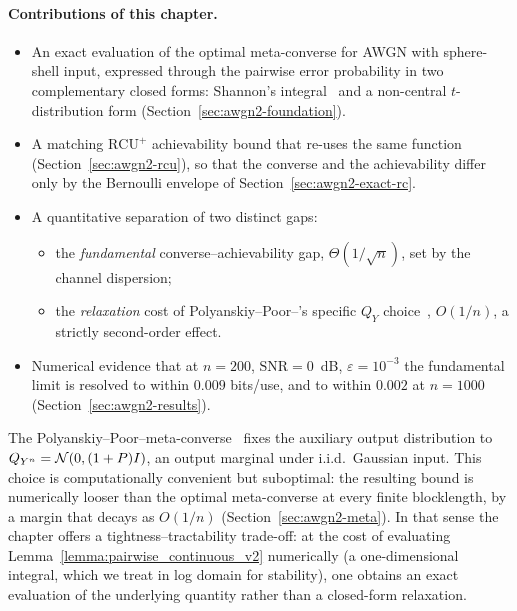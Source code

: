 \paragraph{Contributions of this chapter.}
\begin{itemize}
	\item An exact evaluation of the optimal meta-converse for AWGN with sphere-shell input, expressed through the pairwise error probability in two complementary closed forms: Shannon's integral~\cite{shannon1959probability} and a non-central $t$-distribution form (Section~\ref{sec:awgn2-foundation}).
	\item A matching $\mathrm{RCU}^+$ achievability bound that re-uses the same function (Section~\ref{sec:awgn2-rcu}), so that the converse and the achievability differ only by the Bernoulli envelope of Section~\ref{sec:awgn2-exact-rc}.
	\item A quantitative separation of two distinct gaps:
	\begin{itemize}
		\item the \emph{fundamental} converse--achievability gap, $\Theta(1/\sqrt{n})$, set by the channel dispersion;
		\item the \emph{relaxation} cost of Polyanskiy--Poor--\verdu's specific $Q_Y$ choice~\cite{polyanskiy2010channel}, $O(1/n)$, a strictly second-order effect.
	\end{itemize}
	\item Numerical evidence that at $n = 200$, $\mathrm{SNR} = 0$~dB, $\varepsilon = 10^{-3}$ the fundamental limit is resolved to within $0.009$ bits/use, and to within $0.002$ at $n = 1000$ (Section~\ref{sec:awgn2-results}).
\end{itemize}

The Polyanskiy--Poor--\verdu meta-converse~\cite{polyanskiy2010channel} fixes the auxiliary output distribution to $Q_{Y^n} = \mathcal{N}(0, (1+P) I)$, an output marginal under i.i.d.\ Gaussian input.  This choice is computationally convenient but suboptimal: the resulting bound is numerically looser than the optimal meta-converse at every finite blocklength, by a margin that decays as $O(1/n)$ (Section~\ref{sec:awgn2-meta}).  In that sense the chapter offers a tightness--tractability trade-off: at the cost of evaluating Lemma~\ref{lemma:pairwise_continuous_v2} numerically (a one-dimensional integral, which we treat in log domain for stability), one obtains an exact evaluation of the underlying quantity rather than a closed-form relaxation.


